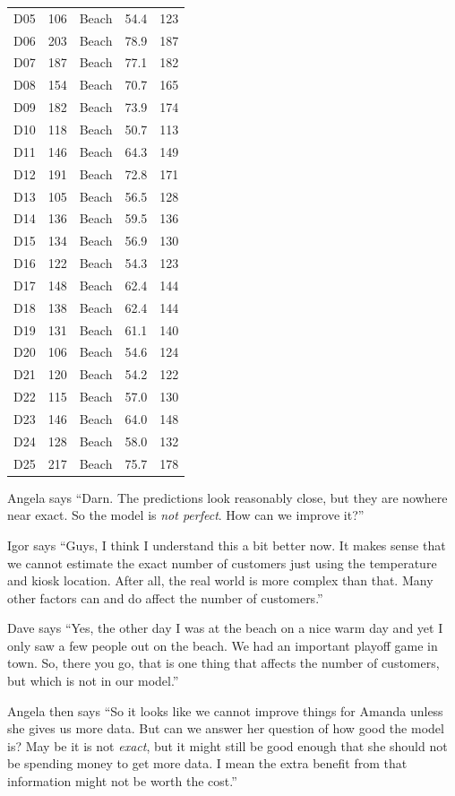 \documentclass[
  12pt,
  letterpaper,
  DIV=11,
  numbers=noendperiod]{scrreprt}
\begin{document}
\begin{longtable}[]{@{}lrlrr@{}}
D05 & 106 & Beach & 54.4 & 123 \\
D06 & 203 & Beach & 78.9 & 187 \\
D07 & 187 & Beach & 77.1 & 182 \\
D08 & 154 & Beach & 70.7 & 165 \\
D09 & 182 & Beach & 73.9 & 174 \\
D10 & 118 & Beach & 50.7 & 113 \\
D11 & 146 & Beach & 64.3 & 149 \\
D12 & 191 & Beach & 72.8 & 171 \\
D13 & 105 & Beach & 56.5 & 128 \\
D14 & 136 & Beach & 59.5 & 136 \\
D15 & 134 & Beach & 56.9 & 130 \\
D16 & 122 & Beach & 54.3 & 123 \\
D17 & 148 & Beach & 62.4 & 144 \\
D18 & 138 & Beach & 62.4 & 144 \\
D19 & 131 & Beach & 61.1 & 140 \\
D20 & 106 & Beach & 54.6 & 124 \\
D21 & 120 & Beach & 54.2 & 122 \\
D22 & 115 & Beach & 57.0 & 130 \\
D23 & 146 & Beach & 64.0 & 148 \\
D24 & 128 & Beach & 58.0 & 132 \\
D25 & 217 & Beach & 75.7 & 178 \\
\end{longtable}

Angela says ``Darn. The predictions look reasonably close, but they are
nowhere near exact. So the model is \emph{not perfect}. How can we
improve it?''

Igor says ``Guys, I think I understand this a bit better now. It makes
sense that we cannot estimate the exact number of customers just using
the temperature and kiosk location. After all, the real world is more
complex than that. Many other factors can and do affect the number of
customers.''

Dave says ``Yes, the other day I was at the beach on a nice warm day and
yet I only saw a few people out on the beach. We had an important
playoff game in town. So, there you go, that is one thing that affects
the number of customers, but which is not in our model.''

Angela then says ``So it looks like we cannot improve things for Amanda
unless she gives us more data. But can we answer her question of how
good the model is? May be it is not \emph{exact}, but it might still be
good enough that she should not be spending money to get more data. I
mean the extra benefit from that information might not be worth the
cost.''
\end{document}

